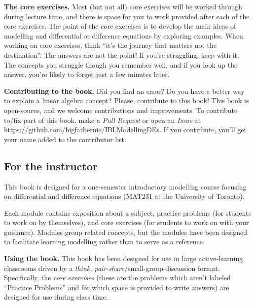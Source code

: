 {\bf The core exercises.} Most (but not all) core exercises will be
worked through during lecture time, and there is space for you to work
provided after each of the core exercises. 
The point of the core exercises is to develop the main ideas of modelling and differential or difference equations by exploring examples. When working on core exercises, think
``it's the journey that matters not the destination''. The
answers are not the point! If you're struggling, keep with it. The
concepts you struggle though you remember well, and if you look up the
answer, you're likely to forget just a few minutes later. 


{\bf Contributing to the book.} Did you find an error? Do you
have a better way to explain a linear algebra concept? Please,
contribute to this book!  This book is open-source, and we welcome
contributions and improvements. To contribute to/fix part of
this book, make a \emph{Pull Request} or open an \emph{Issue} at
\url{https://github.com/bigfatbernie/IBLModellingDEs}. If you contribute,
you'll get your name added to the contributor list.


\subsection*{For the instructor}

This book is designed for a one-semester introductory modelling course focusing on differential and difference equations (MAT231 at the University of Toronto). 


Each module contains exposition about a subject, practice problems (for students to work on by themselves), and core exercises (for students to work on with your guidance). Modules group related concepts, but the modules have been designed to facilitate learning modelling rather than to serve as a reference. 

{\bf Using the book.} This book has been designed for use in large 
active-learning classrooms driven by a \emph{think, pair-share}/small-group-discussion format.
Specifically, the \emph{core exercises} (these are the problems which aren't labeled ``Practice Problems'' and for which space is provided to write answers) are designed for use during class time.

